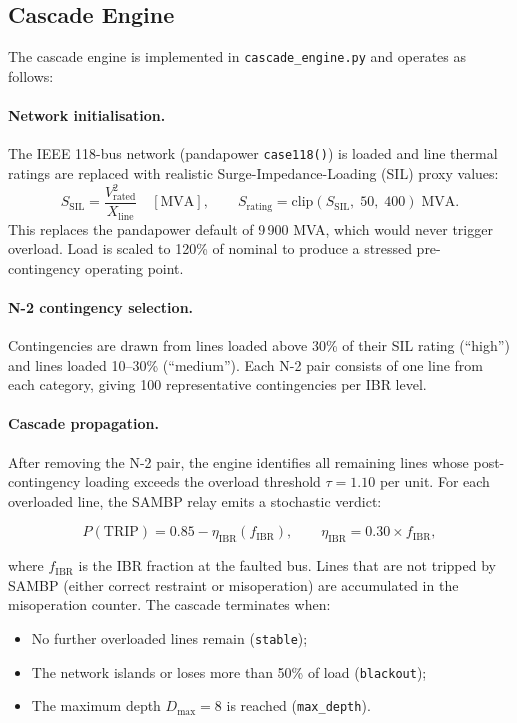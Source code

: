 \documentclass[11pt,a4paper]{article}
\begin{document}
\subsection{Cascade Engine}

The cascade engine is implemented in \texttt{cascade\_engine.py} and operates
as follows:

\paragraph{Network initialisation.}
The IEEE 118-bus network (pandapower \texttt{case118()}) is loaded and
line thermal ratings are replaced with realistic Surge-Impedance-Loading
(SIL) proxy values:
\begin{equation}
  S_\text{SIL} = \frac{V_\text{rated}^2}{X_\text{line}} \quad [\text{MVA}],
  \qquad
  S_\text{rating} = \text{clip}(S_\text{SIL},\;50,\;400)\;\text{MVA}.
  \label{eq:sil}
\end{equation}
This replaces the pandapower default of 9\,900 MVA, which would never
trigger overload.  Load is scaled to 120\% of nominal to produce a
stressed pre-contingency operating point.

\paragraph{N-2 contingency selection.}
Contingencies are drawn from lines loaded above 30\% of their SIL rating
(``high'') and lines loaded 10–30\% (``medium'').  Each N-2 pair consists
of one line from each category, giving 100 representative contingencies
per IBR level.

\paragraph{Cascade propagation.}
After removing the N-2 pair, the engine identifies all remaining lines
whose post-contingency loading exceeds the overload threshold
$\tau = 1.10$ per unit.  For each overloaded line, the SAMBP relay
emits a stochastic verdict:

\begin{equation}
  P(\text{TRIP}) = 0.85 - \eta_\text{IBR}(f_\text{IBR}),
  \qquad
  \eta_\text{IBR} = 0.30 \times f_\text{IBR},
  \label{eq:trip_prob}
\end{equation}

where $f_\text{IBR}$ is the IBR fraction at the faulted bus. Lines that
are not tripped by SAMBP (either correct restraint or misoperation) are
accumulated in the misoperation counter.  The cascade terminates when:
\begin{itemize}
  \item No further overloaded lines remain (\texttt{stable});
  \item The network islands or loses more than 50\% of load
        (\texttt{blackout});
  \item The maximum depth $D_\text{max} = 8$ is reached (\texttt{max\_depth}).
\end{itemize}
\end{document}
